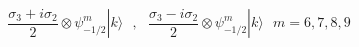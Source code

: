 \begin{equation}
\frac{ \sigma_3 + i \sigma_2}{2} \otimes \psi_{-1/2}^{m} |k\rangle
~~~,~~~ \frac{\sigma_3 - i \sigma_2}{2} \otimes \psi_{-1/2}^{m} |k
\rangle~~~m=6,7,8,9
\label{gau57}
\end{equation}

